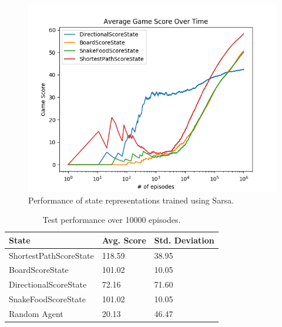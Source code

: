 \documentclass[result.tex]{subfiles}
\begin{document}
    \begin{figure}[ht]
        \centering
        \includegraphics[width=\linewidth]{../images/sarsa/state/42/state_sarsa_average_game_score_over_time.png}
        \caption{Performance of state representations trained using Sarsa.}
        \label{fig:state_sarsa}
    \end{figure}

    \begin{table}[ht]
        \centering
        \begin{tabular}{ | l | l | l | }
            \hline
            State & Avg. Score & Std. Deviation \\ \hline
            ShortestPathScoreState & 118.59 & 38.95 \\ \hline
            BoardScoreState & 101.02 & 10.05 \\ \hline
            DirectionalScoreState & 72.16 & 71.60 \\ \hline
            SnakeFoodScoreState & 101.02 & 10.05 \\ \hline
            Random Agent & 20.13 & 46.47 \\
            \hline
        \end{tabular}
        \caption{Test performance over 10000 episodes.}
        \label{table:state_sarsa}
    \end{table}
\end{document}
